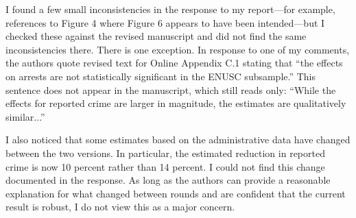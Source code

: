 \begin{bibunit}
\begin{refcomment}
\label{pt:r2_02}
\end{refcomment}


\begin{response}
    
\end{response}


\begin{refcomment}

\smallskip

I found a few small inconsistencies in the response to my report---for example, references to Figure 4 where Figure 6 appears to have been intended---but I checked these against the revised manuscript and did not find the same inconsistencies there. There is one exception. In response to one of my comments, the authors quote revised text for Online Appendix C.1 stating that ``the effects on arrests are not statistically significant in the ENUSC subsample.'' This sentence does not appear in the manuscript, which still reads only: ``While the effects for reported crime are larger in magnitude, the estimates are qualitatively similar...''

\label{pt:r2_03}
\end{refcomment}

\begin{response}
    
\end{response}




\begin{refcomment}

\smallskip

I also noticed that some estimates based on the administrative data have changed between the two versions. In particular, the estimated reduction in reported crime is now 10 percent rather than 14 percent. I could not find this change documented in the response. As long as the authors can provide a reasonable explanation for what changed between rounds and are confident that the current result is robust, I do not view this as a major concern.

\label{pt:r2_04}
\end{refcomment}

\begin{response}
    
\end{response}


\begin{refcomment}


\end{refcomment}
\end{bibunit}
